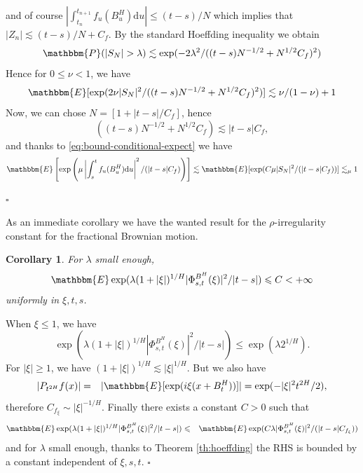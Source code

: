 \documentclass[a4paper,11pt]{article}
\newcommand{\mathd}{\mathrm{d}}
\newcommand{\nosymbol}{}
\newtheorem{corollary}[theorem]{Corollary}
\newenvironment{proof}{{\sc Proof.}}{\hfill$\square$}
\begin{document}
\begin{proof}
  and of course $| \int_{t_{n}^{\nosymbol}}^{t_{n+1}} f_{u} ( B^{H}_{u} )
  \mathd u| \leqslant ( t-s ) /N$ which implies that $| Z_{n} | \lesssim ( t-s
  ) /N+C_{f}$. By the standard Hoeffding inequality we obtain
  \[  \mathbbm{P} ( | S_{N} | > \lambda ) \lesssim \exp ( -2 \lambda^{2} / (
     ( t-s ) N^{-1/2} +N^{1/2} C_{f} )^{2} ) \]
  Hence for $0 \leqslant \nu <1$, we have
  \[ \mathbbm{E} [ \exp ( 2 \nu | S_{N} |^{2} / ( ( t-s ) N^{-1/2} +N^{1/2}
     C_{f} )^{2} ) ] \lesssim \nu / ( 1- \nu ) +1 \]
  Now, we can chose $N= [ 1+ | t-s | /C_{f} ]$, hence
  \[ ( ( t-s ) N^{-1/2} +N^{1/2} C_{f} ) \lesssim | t-s | C_{f} , \]
  and thanks to {\eqref{eq:bound-conditional-expect}} we have
  \[ \mathbbm{E} \left[ \exp \left( \mu \left\lvert \int_{s}^{t} f_{u} ( B^{H}_{u}
     ) \mathd u \right\lvert^{2} / ( | t-s | C_{f} ) \right) \right] \lesssim
     \mathbbm{E} [ \exp ( C \mu | S_{N} |^{2} / ( | t-s | C_{f} ) ) ]
     \lesssim_{\mu} 1 \]
  
\end{proof}

As an immediate corollary we have the wanted result for the
$\rho$-irregularity constant for the fractional Brownian motion.

\begin{corollary}
  \label{cor:irr-fbm}For $\lambda$ small enough,
  \[ \mathbbm{E}  \exp ( \lambda ( 1+ | \xi | )^{1/H} | \Phi_{s,t}^{B^{H}} (
     \xi ) |^{2} / | t-s | ) \leqslant C<+ \infty \]
  uniformly in $\xi ,t,s$. 
\end{corollary}

\begin{proof}
  When $\xi \leqslant 1$, we have
  \[ \exp ( \lambda ( 1+ | \xi | )^{1/H} | \Phi^{B^{H}}_{s,t} ( \xi ) |^{2} /
     | t-s | ) \leqslant \exp ( \lambda 2^{1/H} ) . \]
  For $| \xi | \geqslant 1$, we have $ ( 1+ | \xi | )^{1/H} \lesssim
  | \xi |^{1/H}$. But we also have
  \begin{eqnarray*}
    | P_{t^{2H}} f ( x ) | & = & | \mathbbm{E} [ \exp ( i \xi ( x+B^{H}_{t} )
    ) ] |
    =  \exp ( - | \xi |^{2} t^{2H} /2 ) ,
  \end{eqnarray*}
  therefore
  $ C_{f_{\xi}} \sim | \xi |^{-1/H} $. 
  Finally there exists a constant $C>0$ such that
  \begin{eqnarray*}
    \mathbbm{E}  \exp ( \lambda ( 1+ | \xi | )^{1/H} | \Phi_{s,t}^{B^{H}} (
    \xi ) |^{2} / | t-s | ) & \leqslant & \mathbbm{E}  \exp ( C \lambda |
    \Phi_{s,t}^{B^{H}} ( \xi ) |^{2} / ( | t-s | C_{f_{\xi}} ) )
  \end{eqnarray*}
  and for $\lambda$ small enough, thanks to Theorem \ref{th:hoeffding} the RHS
  is bounded by a constant independent of $\xi ,s,t$.
\end{proof}
\end{document}
